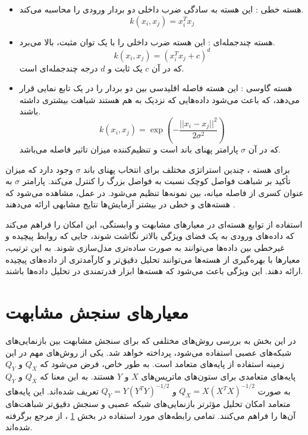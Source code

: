 \begin{itemize}
\item
هسته خطی%
:
این هسته به سادگی ضرب داخلی دو بردار ورودی را محاسبه می‌کند.
\begin{equation}
	k(x_i, x_j) = x_i^T x_j
\end{equation}
	
	
	
\item 
هسته چندجمله‌ای%
:
این هسته ضرب داخلی را با یک توان مثبت، بالا می‌برد.
\begin{equation}
	k(x_i, x_j) = (x_i^T x_j + c)^d
\end{equation}
که در آن \( c \) یک ثابت و \( d \) درجه چندجمله‌ای است.

	
\item
هسته گاوسی
%
:
این هسته فاصله اقلیدسی بین دو بردار را در یک تابع نمایی قرار می‌دهد، که باعث می‌شود داده‌هایی که نزدیک به هم هستند شباهت بیشتری داشته باشند.
\begin{equation}
	k(x_i, x_j) = \exp\left(-\frac{||x_i - x_j||^2}{2\sigma^2}\right)
\end{equation}
که در آن \( \sigma \) پارامتر پهنای باند است و تنظیم‌کننده میزان تاثیر فاصله می‌باشد.
\end{itemize}

برای هسته
%
، چندین استراتژی مختلف برای انتخاب پهنای باند \(\sigma\) وجود دارد که میزان تأکید بر شباهت فواصل کوچک نسبت به فواصل بزرگ را کنترل می‌کند. پارامتر \(\sigma\) به عنوان کسری از فاصله میانه، بین نمونه‌ها تنظیم می‌شود. در عمل، مشاهده می‌شود که هسته‌های
و خطی در بیشتر آزمایش‌ها نتایج مشابهی ارائه می‌دهند
\cite{kornblith2019similarity}.

استفاده از توابع هسته‌ای در معیارهای مشابهت و وابستگی، این امکان را فراهم می‌کند که داده‌های ورودی به یک فضای ویژگی بالاتر نگاشت شوند، جایی که روابط پیچیده و غیرخطی بین داده‌ها می‌توانند به صورت ساده‌تری مدل‌سازی شوند. به این ترتیب، معیارها با بهره‌گیری از هسته‌ها می‌توانند تحلیل دقیق‌تر و کارآمدتری از داده‌های پیچیده ارائه دهند. این ویژگی باعث می‌شود که هسته‌ها ابزار قدرتمندی در تحلیل داده‌ها باشند.



\section{
	معیار‌های سنجش مشابهت
}\label{sec_similarity_measurement_criteria}
در این بخش به بررسی روش‌های مختلفی که برای سنجش مشابهت بین بازنمایی‌های شبکه‌های عصبی استفاده می‌شود، پرداخته خواهد شد. یکی از روش‌های مهم در این زمینه استفاده از پایه‌های متعامد است. به طور خاص، فرض می‌شود که \( Q_X \) و \( Q_Y \) پایه‌های متعامدی برای ستون‌های ماتریس‌های \( X \) و \( Y \) هستند. به این معنا که \( Q_X \) و \( Q_Y \) به صورت \( Q_X = X(X^T X)^{-1/2} \) و \( Q_Y = Y(Y^T Y)^{-1/2} \) تعریف شده‌اند. این پایه‌های متعامد امکان تحلیل مؤثرتر بازنمایی‌های شبکه عصبی و سنجش دقیق‌تر شباهت‌های آن‌ها را فراهم می‌کنند.
تمامی رابطه‌های مورد استفاده در بخش
\ref{sec_similarity_measurement_criteria}%
، از مرجع 
\cite{kornblith2019similarity} 
برگرفته شده‌اند.



